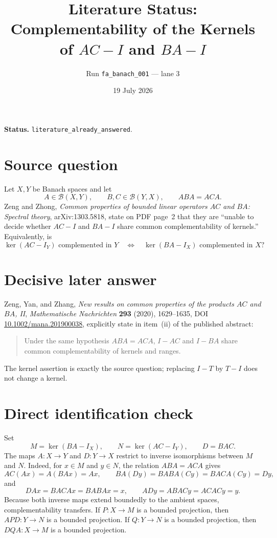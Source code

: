 \documentclass[11pt]{article}
\title{Literature Status: Complementability of the Kernels of
$AC-I$ and $BA-I$}
\author{Run \texttt{fa\_banach\_001} --- lane 3}
\date{19 July 2026}
\begin{document}
\maketitle

\textbf{Status.} \texttt{literature\_already\_answered}.

\section*{Source question}
Let $X,Y$ be Banach spaces and let
\[
 A\in\mathcal B(X,Y),\qquad B,C\in\mathcal B(Y,X),\qquad ABA=ACA.
\]
Zeng and Zhong, \emph{Common properties of bounded linear operators $AC$ and
$BA$: Spectral theory}, arXiv:1303.5818, state on PDF page~2 that they are
``unable to decide whether $AC-I$ and $BA-I$ share common complementability of
kernels.'' Equivalently, is
\[
 \ker(AC-I_Y)\text{ complemented in }Y
 \quad\Longleftrightarrow\quad
 \ker(BA-I_X)\text{ complemented in }X?
\]

\section*{Decisive later answer}
Zeng, Yan, and Zhang, \emph{New results on common properties of the products
$AC$ and $BA$, II}, \emph{Mathematische Nachrichten} \textbf{293} (2020),
1629--1635, DOI \href{https://doi.org/10.1002/mana.201900038}
{10.1002/mana.201900038}, explicitly state in item~(ii) of the published
abstract:
\begin{quote}
Under the same hypothesis $ABA=ACA$, $I-AC$ and $I-BA$ share common
complementability of kernels and ranges.
\end{quote}
The kernel assertion is exactly the source question; replacing $I-T$ by
$T-I$ does not change a kernel.

\section*{Direct identification check}
Set
\[
 M=\ker(BA-I_X),\qquad N=\ker(AC-I_Y),\qquad D=BAC.
\]
The maps $A:X\to Y$ and $D:Y\to X$ restrict to inverse isomorphisms between
$M$ and $N$. Indeed, for $x\in M$ and $y\in N$, the relation $ABA=ACA$ gives
\[
 AC(Ax)=A(BAx)=Ax,
 \qquad
 BA(Dy)=BABA(Cy)=BACA(Cy)=Dy,
\]
and
\[
 DAx=BACA x=BABA x=x,
 \qquad
 ADy=ABACy=ACACy=y.
\]
Because both inverse maps extend boundedly to the ambient spaces,
complementability transfers. If $P:X\to M$ is a bounded projection, then
$APD:Y\to N$ is a bounded projection. If $Q:Y\to N$ is a bounded projection,
then $DQA:X\to M$ is a bounded projection.
\end{document}
